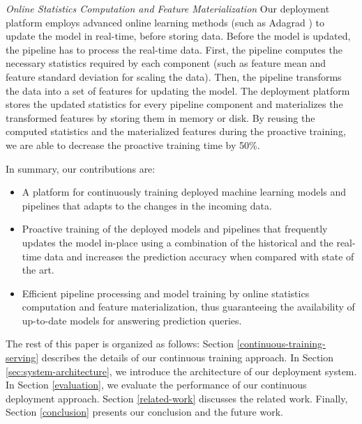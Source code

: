 \textit{Online Statistics Computation and Feature Materialization}
Our deployment platform employs advanced online learning methods (such as Adagrad \cite{duchi2011adaptive}) to update the model in real-time, before storing data.
Before the model is updated, the pipeline has to process the real-time data.
First, the pipeline computes the necessary statistics required by each component (such as feature mean and feature standard deviation for scaling the data).
Then, the pipeline transforms the data into a set of features for updating the model. 
The deployment platform stores the updated statistics for every pipeline component and materializes the transformed features by storing them in memory or disk.
By reusing the computed statistics and the materialized features during the proactive training, we are able to decrease the proactive training time by 50\%.

In summary, our contributions are:
\begin{itemize}
\item A platform for continuously training deployed machine learning models and pipelines that adapts to the changes in the incoming data.
\item Proactive training of the deployed models and pipelines that frequently updates the model in-place using a combination of the historical and the real-time data and increases the prediction accuracy when compared with state of the art.
\item Efficient pipeline processing and model training by online statistics computation and feature materialization, thus guaranteeing the availability of up-to-date models for answering prediction queries.
\end{itemize}

The rest of this paper is organized as follows:
Section \ref{continuous-training-serving} describes the details of our continuous training approach.
In Section \ref{sec:system-architecture}, we introduce the architecture of our deployment system.
In Section \ref{evaluation}, we evaluate the performance of our continuous deployment approach.
Section \ref {related-work} discusses the related work.
Finally, Section \ref{conclusion} presents our conclusion and the future work.
